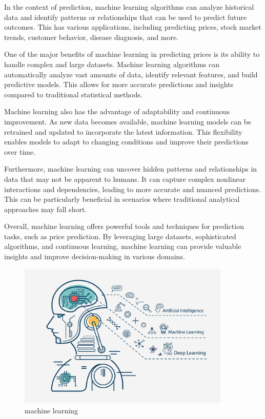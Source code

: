 \documentclass{article}
\begin{document}
In the context of prediction, machine learning algorithms can analyze historical data and identify patterns or relationships that can be used to predict future outcomes. This has various applications, including predicting prices, stock market trends, customer behavior, disease diagnosis, and more.

One of the major benefits of machine learning in predicting prices is its ability to handle complex and large datasets. Machine learning algorithms can automatically analyze vast amounts of data, identify relevant features, and build predictive models. This allows for more accurate predictions and insights compared to traditional statistical methods.

Machine learning also has the advantage of adaptability and continuous improvement. As new data becomes available, machine learning models can be retrained and updated to incorporate the latest information. This flexibility enables models to adapt to changing conditions and improve their predictions over time.

Furthermore, machine learning can uncover hidden patterns and relationships in data that may not be apparent to humans. It can capture complex nonlinear interactions and dependencies, leading to more accurate and nuanced predictions. This can be particularly beneficial in scenarios where traditional analytical approaches may fall short.

Overall, machine learning offers powerful tools and techniques for prediction tasks, such as price prediction. By leveraging large datasets, sophisticated algorithms, and continuous learning, machine learning can provide valuable insights and improve decision-making in various domains.

\begin{figure}[ht]
    \centering
    \includegraphics[width=0.9\textwidth]{machine.jpg}
    \caption{machine learning}
    \label{fig:my_label}
\end{figure}
\end{document}
